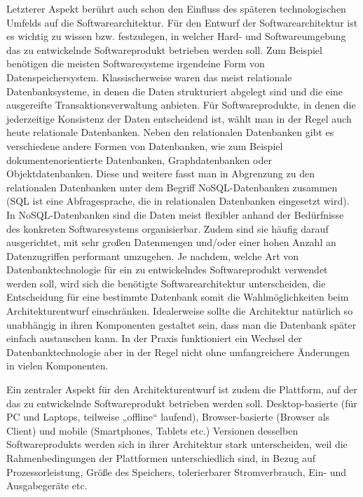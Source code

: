 \vspace{1mm} %

Letzterer Aspekt  
berührt auch schon den Einfluss des späteren technologischen Umfelds auf die Softwarearchitektur.  Für den Entwurf der Softwarearchitektur ist es wichtig zu wissen bzw. festzulegen, in welcher Hard- und Softwareumgebung das zu entwickelnde Softwareprodukt betrieben werden soll. Zum Beispiel benötigen die meisten Softwaresysteme irgendeine Form von Datenspeichersystem. Klassischer\-weise waren das meist relationale Datenbanksysteme, in denen die Daten strukturiert abgelegt sind und die eine ausgereifte Transaktionsverwaltung anbieten. Für Softwareprodukte, in denen die jederzeitige Konsistenz der Daten entscheidend ist, wählt man in der Regel auch heute relationale Datenbanken. Neben den relationalen Datenbanken gibt es verschiedene andere Formen von Datenbanken, wie zum Beispiel dokumentenorientierte Datenbanken, Graphdatenbanken oder Objektdatenbanken. Diese und weitere fasst man in Abgrenzung zu den relationalen Datenbanken unter dem Begriff NoSQL-Datenbanken zusammen (SQL ist eine Abfragesprache, die in relationalen Datenbanken eingesetzt wird). In NoSQL-Datenbanken sind die Daten meist flexibler anhand der Bedürfnisse des konkreten Softwaresystems organisierbar. Zudem sind sie häufig darauf ausgerichtet, mit sehr großen Datenmengen und/oder einer hohen Anzahl an Datenzugriffen performant umzugehen. Je nachdem, welche Art von Datenbanktechnologie für ein zu entwickelndes Softwareprodukt verwendet werden soll, wird sich die benötigte Softwarearchitektur unterscheiden, die Entscheidung für eine bestimmte Datenbank somit die Wahlmöglichkeiten beim Architekturentwurf einschränken. Idealerweise sollte die Architektur natürlich so unabhängig in ihren Komponenten gestaltet sein, dass man die Datenbank später einfach austauschen kann. In der Praxis funktioniert ein Wechsel der Datenbanktechnologie aber in der Regel nicht ohne umfangreichere Änderungen in vielen Komponenten.

Ein zentraler Aspekt für den Architekturentwurf ist zudem die Plattform, auf der das zu entwickelnde Softwareprodukt betrieben werden soll. Desktop-basierte (für PC und Laptops, teilweise „offline“ laufend), Browser-basierte (Browser als Client) und mobile (Smartphones, Tablets etc.) Versionen desselben Softwareprodukts werden sich in ihrer Architektur stark unterscheiden, weil die Rahmenbedingungen der Plattformen unterschiedlich sind, \zb in Bezug auf Prozessorleistung, Größe des Speichers, tolerierbarer Stromverbrauch, Ein- und Ausgabegeräte etc.